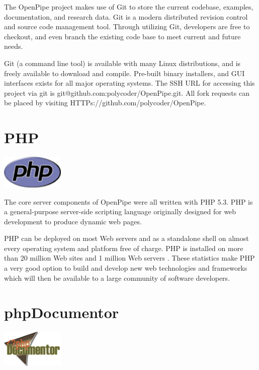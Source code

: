 \documentclass[12pt]{report}
\begin{document}
The OpenPipe project makes use of Git to store the current codebase, examples, documentation, and research data. Git is a modern distributed revision control and source code management tool. Through utilizing Git, developers are free to checkout, and even branch the existing code base to meet current and future needs.

Git (a command line tool) is available with many Linux distributions, and is freely available to download and compile. Pre-built binary installers, and GUI interfaces exists for all major operating systems.  The SSH URL for accessing this project via git is git@github.com:polycoder/OpenPipe.git. All fork requests can be placed by visiting HTTPs://github.com/polycoder/OpenPipe.

\section{PHP}
\begin{center} 
\includegraphics[width=30mm]{figures/images/php_logo.png}
\end{center}

The core server components of OpenPipe were all written with PHP 5.3. PHP is a general-purpose server-side scripting language originally designed for web development to produce dynamic web pages.

PHP can be deployed on most Web servers and as a standalone shell on almost every operating system and platform free of charge.  PHP is installed on more than 20 million Web sites and 1 million Web servers \cite{phpWiki}. These statistics make PHP a very good option to build and develop new web technologies and frameworks which will then be available to a large community of software developers.


\section{phpDocumentor}
\begin{center} 
\includegraphics[width=30mm]{figures/images/php_documentor_logo.png}
\end{center}
\end{document}
